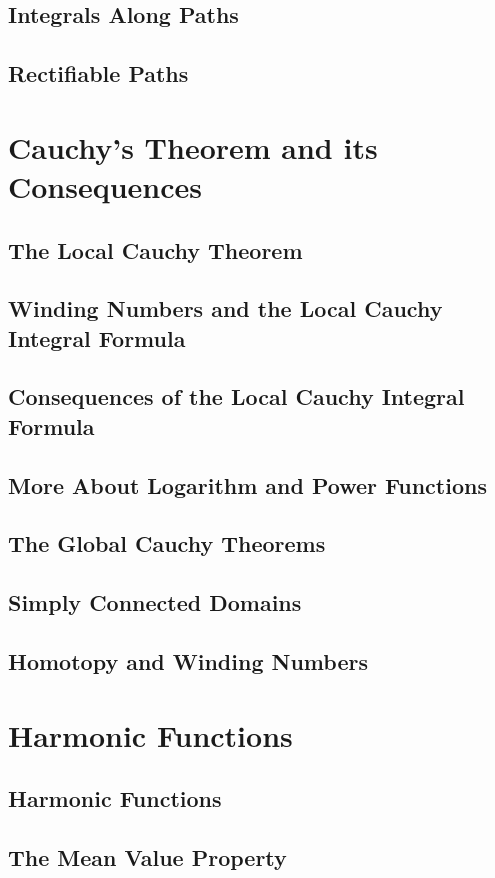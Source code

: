 \documentclass[11pt, a4paper, latinreim, shortsets]{notes}
\begin{document}
\begin{enumerate}[label={\bfseries II.5.\arabic*}]
\section{Integrals Along Paths}
\section{Rectifiable Paths}

\chapter{Cauchy's Theorem and its Consequences}
\section{The Local Cauchy Theorem}
\section{Winding Numbers and the Local Cauchy Integral Formula}
\section{Consequences of the Local Cauchy Integral Formula}
\section{More About Logarithm and Power Functions}
\section{The Global Cauchy Theorems}
\section{Simply Connected Domains}
\section{Homotopy and Winding Numbers}

\chapter{Harmonic Functions}
\section{Harmonic Functions}
\section{The Mean Value Property}

\end{enumerate}
\end{document}
